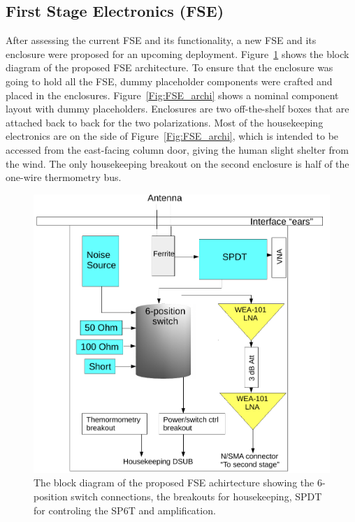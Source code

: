 \subsection{First Stage Electronics (FSE)}

After assessing the current FSE and its functionality, a new FSE and its enclosure were proposed for an upcoming deployment. Figure~\ref{Fig:FSE_rev} shows the block diagram of the proposed FSE architecture. To ensure that the enclosure was going to hold all the FSE, dummy placeholder components were crafted and placed in the enclosures. Figure~\ref{Fig:FSE_archi} shows a nominal component layout with dummy placeholders. Enclosures are two off-the-shelf boxes that are attached back to back for the two polarizations. Most of the housekeeping electronics are on the side of Figure~\ref{Fig:FSE_archi}, which is intended to be accessed from the east-facing column door, giving the human slight shelter from the wind. The only housekeeping breakout on the second enclosure is half of the one-wire thermometry bus.

\begin{figure}
	\centering
	\includegraphics[width=0.7\linewidth]{Figures/FSE_rev}
	\caption{The block diagram of the proposed FSE achirtecture showing the 6-position switch connections, the breakouts for housekeeping, SPDT for controling the SP6T and amplification.}
	\label{Fig:FSE_rev}
\end{figure} 

